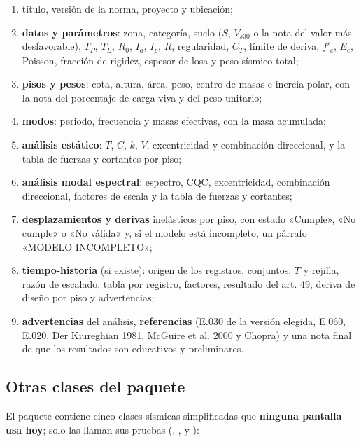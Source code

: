 \begin{enumerate}
	\item título, versión de la norma, proyecto y ubicación;
	\item \textbf{datos y parámetros}: zona, categoría, suelo ($S$, $V_{s30}$ o la nota del valor más desfavorable), $T_P$,
	      $T_L$, $R_0$, $I_a$, $I_p$, $R$, regularidad, $C_T$, límite de deriva, $f'_c$, $E_c$, Poisson, fracción de
	      rigidez, espesor de losa y peso sísmico total;
	\item \textbf{pisos y pesos}: cota, altura, área, peso, centro de masas e inercia polar, con la nota del porcentaje de
	      carga viva y del peso unitario;
	\item \textbf{modos}: periodo, frecuencia y masas efectivas, con la masa acumulada;
	\item \textbf{análisis estático}: $T$, $C$, $k$, $V$, excentricidad y combinación direccional, y la tabla de fuerzas y
	      cortantes por piso;
	\item \textbf{análisis modal espectral}: espectro, CQC, excentricidad, combinación direccional, factores de escala y la
	      tabla de fuerzas y cortantes;
	\item \textbf{desplazamientos y derivas} inelásticos por piso, con estado «Cumple», «No cumple» o «No válida» y, si el
	      modelo está incompleto, un párrafo «MODELO INCOMPLETO»;
	\item \textbf{tiempo-historia} (si existe): origen de los registros, conjuntos, $T$ y rejilla, razón de escalado, tabla
	      por registro, factores, resultado del art. 49, deriva de diseño por piso y advertencias;
	\item \textbf{advertencias} del análisis, \textbf{referencias} (E.030 de la versión elegida, E.060, E.020,
	      Der Kiureghian 1981, McGuire et al. 2000 y Chopra) y una nota final de que los resultados son educativos y
	      preliminares.
\end{enumerate}

\subsection{Otras clases del paquete}
\label{sec:sis-auxiliares}

El paquete  contiene cinco clases sísmicas simplificadas que \textbf{ninguna pantalla usa hoy}; solo las
llaman sus pruebas (, ,  y
):

